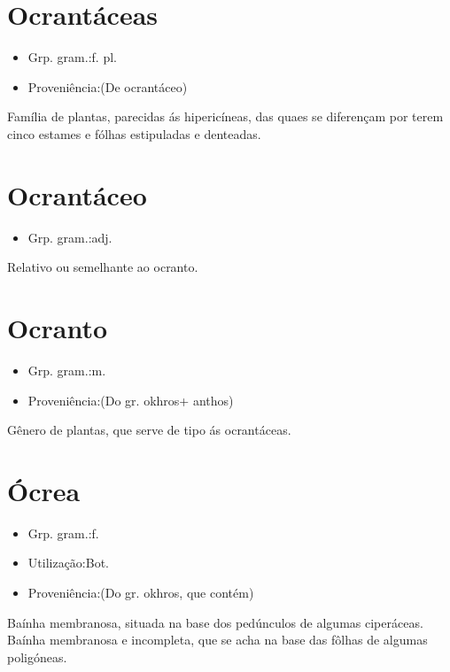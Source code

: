 \section{Ocrantáceas}
\begin{itemize}
\item {Grp. gram.:f. pl.}
\end{itemize}
\begin{itemize}
\item {Proveniência:(De \textunderscore ocrantáceo\textunderscore )}
\end{itemize}
Família de plantas, parecidas ás hipericíneas, das quaes se diferençam por terem cinco estames e fólhas estipuladas e denteadas.
\section{Ocrantáceo}
\begin{itemize}
\item {Grp. gram.:adj.}
\end{itemize}
Relativo ou semelhante ao ocranto.
\section{Ocranto}
\begin{itemize}
\item {Grp. gram.:m.}
\end{itemize}
\begin{itemize}
\item {Proveniência:(Do gr. \textunderscore okhros\textunderscore  + \textunderscore anthos\textunderscore )}
\end{itemize}
Gênero de plantas, que serve de tipo ás ocrantáceas.
\section{Ócrea}
\begin{itemize}
\item {Grp. gram.:f.}
\end{itemize}
\begin{itemize}
\item {Utilização:Bot.}
\end{itemize}
\begin{itemize}
\item {Proveniência:(Do gr. \textunderscore okhros\textunderscore , que contém)}
\end{itemize}
Baínha membranosa, situada na base dos pedúnculos de algumas ciperáceas.
Baínha membranosa e incompleta, que se acha na base das fôlhas de algumas poligóneas.

